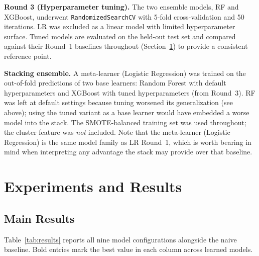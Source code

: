 \documentclass{article}
\begin{document}
\textbf{Round 3 (Hyperparameter tuning).} The two ensemble models, RF
and XGBoost, underwent \texttt{RandomizedSearchCV} with 5-fold
cross-validation and 50 iterations. LR was excluded as a linear model
with limited hyperparameter surface. Tuned models are evaluated on the
held-out test set and compared against their Round~1 baselines throughout
(Section~\ref{sec:experiments}) to provide a consistent reference point.

\textbf{Stacking ensemble.} A meta-learner (Logistic Regression) was
trained on the out-of-fold predictions of two base learners: Random Forest
with default hyperparameters and XGBoost with tuned hyperparameters (from
Round~3). RF was left at default settings because tuning worsened its
generalization (see above); using the tuned variant as a base learner
would have embedded a worse model into the stack. The SMOTE-balanced
training set was used throughout; the cluster feature was \textit{not}
included. Note that the meta-learner (Logistic Regression) is the same
model family as LR Round~1, which is worth bearing in mind when
interpreting any advantage the stack may provide over that baseline.

\section{Experiments and Results}
\label{sec:experiments}

\subsection{Main Results}

Table~\ref{tab:results} reports all nine model configurations alongside the
naive baseline. Bold entries mark the best value in each column across
learned models.
\end{document}
